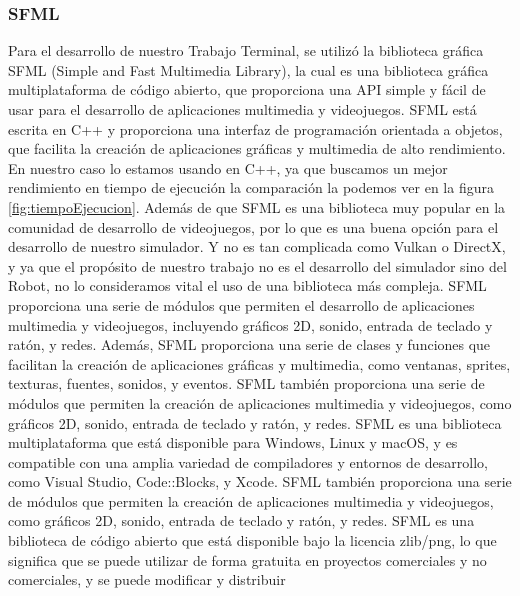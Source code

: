 \subsubsection{SFML}
    Para el desarrollo de nuestro Trabajo Terminal, se utiliz\'o la biblioteca gr\'afica SFML (Simple and Fast Multimedia Library), 
        la cual es una biblioteca gr\'afica multiplataforma de c\'odigo abierto, que proporciona una API simple y f\'acil de usar 
        para el desarrollo de aplicaciones multimedia y videojuegos. SFML est\'a escrita en C++ y proporciona una interfaz de 
        programaci\'on orientada a objetos, que facilita la creaci\'on de aplicaciones gr\'aficas y multimedia de alto rendimiento.
    \vskip 0.5cm
    En nuestro caso lo estamos usando en C++, ya que buscamos un mejor rendimiento en tiempo de ejecuci\'on la comparaci\'on la podemos ver
        en la figura \ref{fig:tiempoEjecucion}. Adem\'as de que SFML es una biblioteca muy popular en la comunidad de desarrollo de videojuegos, por lo que es una buena opci\'on 
        para el desarrollo de nuestro simulador. Y no es tan complicada como Vulkan o DirectX, y ya que el prop\'osito de nuestro trabajo 
        no es el desarrollo del simulador sino del Robot, no lo consideramos vital el uso de una biblioteca m\'as compleja.
    \vskip 0.5cm
    SFML proporciona una serie de m\'odulos que permiten el desarrollo de aplicaciones multimedia y videojuegos, 
        incluyendo gr\'aficos 2D, sonido, entrada de teclado y rat\'on, y redes. Adem\'as, SFML proporciona una serie de 
        clases y funciones que facilitan la creaci\'on de aplicaciones gr\'aficas y multimedia, como ventanas, sprites, 
        texturas, fuentes, sonidos, y eventos. SFML tambi\'en proporciona una serie de m\'odulos que permiten la creaci\'on 
        de aplicaciones multimedia y videojuegos, como gr\'aficos 2D, sonido, entrada de teclado y rat\'on, y redes.
    \vskip 0.5cm
    SFML es una biblioteca multiplataforma que est\'a disponible para Windows, Linux y macOS, y es compatible con una 
        amplia variedad de compiladores y entornos de desarrollo, como Visual Studio, Code::Blocks, y Xcode. SFML tambi\'en 
        proporciona una serie de m\'odulos que permiten la creaci\'on de aplicaciones multimedia y videojuegos, como gr\'aficos 
        2D, sonido, entrada de teclado y rat\'on, y redes.
    \vskip 0.5cm
    SFML es una biblioteca de c\'odigo abierto que est\'a disponible bajo la licencia zlib/png, lo que significa que 
        se puede utilizar de forma gratuita en proyectos comerciales y no comerciales, y se puede modificar y distribuir 
